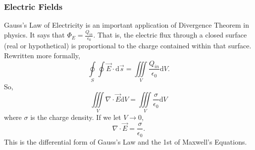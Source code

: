 \subsubsection{Electric Fields}
\noindent
Gauss's Law of Electricity is an important application of Divergence Theorem in physics. It says that $\Phi_{E} = \frac{Q_{in}}{\epsilon_{0}}$. That is, the electric flux through a closed surface (real or hypothetical) is proportional to the charge contained within that surface. Rewritten more formally, 
\begin{equation*}
	\oint\limits_{S}\oint{\vec{E} \cdot \mathrm{d}\vec{s}} = \iiint\limits_{V}{\frac{Q_{in}}{\epsilon_{0}}\mathrm{d}V}.
\end{equation*}
So, 
\begin{equation*}
	\iiint\limits_{V}{\nabla\cdot\vec{E}\mathrm{d}V} = \iiint\limits_{V}{\frac{\sigma}{\epsilon_{0}}\mathrm{d}V}
\end{equation*}
where $\sigma$ is the charge density.
If we let $V \to 0$, 
\begin{equation*}
	\nabla \cdot \vec{E} = \frac{\sigma}{\epsilon_{0}}.
\end{equation*}
This is the differential form of Gauss's Law and the 1st of Maxwell's Equations.